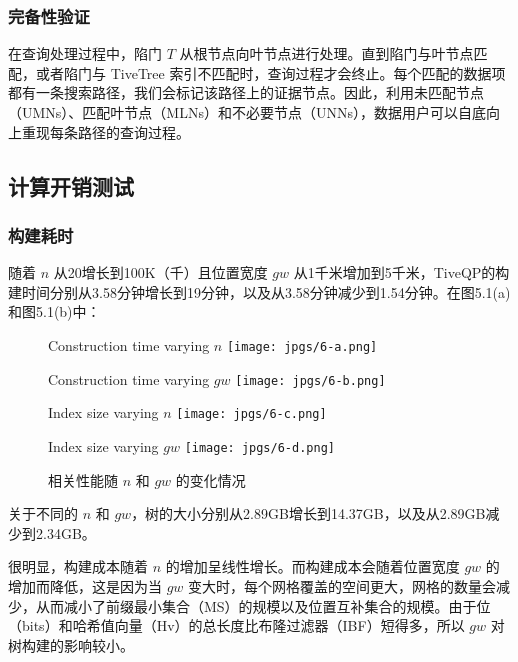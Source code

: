 \documentclass{cumcmthesis}
\numberwithin{equation}{section} %
\numberwithin{figure}{section} %
\numberwithin{table}{section} %
\begin{document}
\subsubsection{完备性验证}
在查询处理过程中，陷门 $T$ 从根节点向叶节点进行处理。直到陷门与叶节点匹配，或者陷门与 TiveTree 索引不匹配时，查询过程才会终止。每个匹配的数据项都有一条搜索路径，我们会标记该路径上的证据节点。因此，利用未匹配节点（UMNs）、匹配叶节点（MLNs）和不必要节点（UNNs），数据用户可以自底向上重现每条路径的查询过程。

\subsection{计算开销测试}
\subsubsection{构建耗时}
随着 \(n\) 从20增长到100K（千）且位置宽度 \(gw\) 从1千米增加到5千米，TiveQP的构建时间分别从3.58分钟增长到19分钟，以及从3.58分钟减少到1.54分钟。在图5.1(a)和图5.1(b)中：

\begin{figure}[h]
    \centering
    \begin{subcaptionbox}{Construction time varying \(n\)}
        {\texttt{[image: jpgs/6-a.png]}}
    \end{subcaptionbox}
    \hfill
    \begin{subcaptionbox}{Construction time varying \(gw\)}
        {\texttt{[image: jpgs/6-b.png]}}
    \end{subcaptionbox}
    \centering
    \begin{subcaptionbox}{Index size varying \(n\)}
        {\texttt{[image: jpgs/6-c.png]}}
    \end{subcaptionbox}
    \hfill
    \begin{subcaptionbox}{Index size varying \(gw\)}
        {\texttt{[image: jpgs/6-d.png]}}
    \end{subcaptionbox}
    \caption{相关性能随 \(n\) 和 \(gw\) 的变化情况}
\end{figure}

关于不同的 \(n\) 和 \(gw\)，树的大小分别从2.89GB增长到14.37GB，以及从2.89GB减少到2.34GB。

很明显，构建成本随着 \(n\) 的增加呈线性增长。而构建成本会随着位置宽度 \(gw\) 的增加而降低，这是因为当 \(gw\) 变大时，每个网格覆盖的空间更大，网格的数量会减少，从而减小了前缀最小集合（MS）的规模以及位置互补集合的规模。由于位（bits）和哈希值向量（Hv）的总长度比布隆过滤器（IBF）短得多，所以 \(gw\) 对树构建的影响较小。
\end{document}
